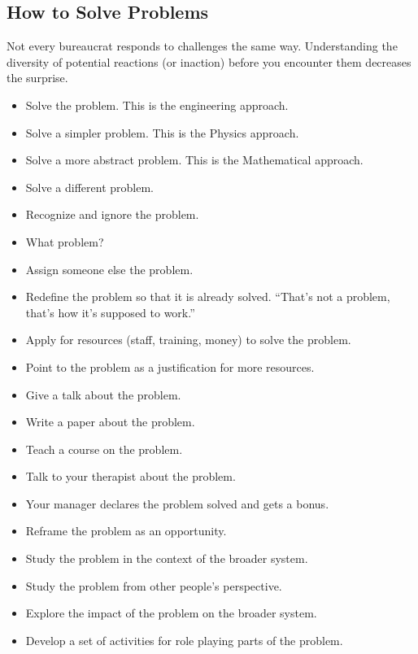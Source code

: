 \subsection*{How to Solve Problems}


Not every bureaucrat responds to challenges the same way. Understanding the diversity of potential reactions (or inaction) before you encounter them decreases the surprise. 

\begin{itemize}
    \item Solve the problem. This is the engineering approach.
    \item Solve a simpler problem. This is the Physics approach.
    \item Solve a more abstract problem. This is the Mathematical approach.
    \item Solve a different problem.
    \item Recognize and ignore the problem. 
    \item What problem?
    \item Assign someone else the problem.
    \item Redefine the problem so that it is already solved. ``That's not a problem, that's how it's supposed to work.''
    \item Apply for resources (staff, training, money) to solve the problem.
    \item Point to the problem as a justification for more resources.
    \item Give a talk about the problem.
    \item Write a paper about the problem.
    \item Teach a course on the problem.
    \item Talk to your therapist about the problem.
    \item Your manager declares the problem solved and gets a bonus.
    \item Reframe the problem as an opportunity. 
    \item Study the problem in the context of the broader system.
    \item Study the problem from other people's perspective.
    \item Explore the impact of the problem on the broader system.
    \item Develop a set of activities for role playing parts of the problem. 

\end{itemize}
